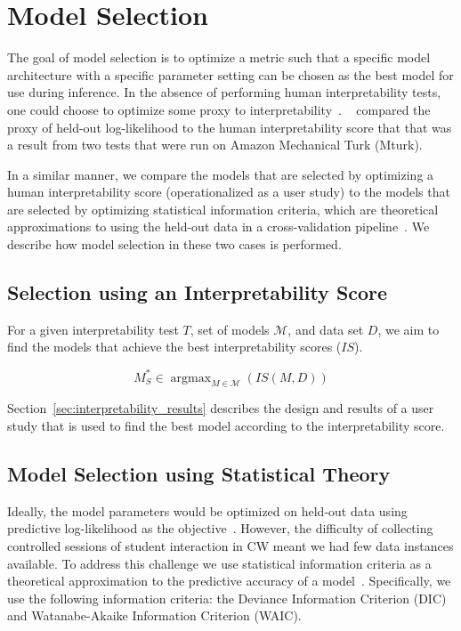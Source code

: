 \documentclass[letterpaper]{article}
\newcommand{\citename}[1]{\citeauthor{#1}~\shortcite{#1}}
\DeclareMathOperator{\argmax}{argmax}
\begin{document}
\section{Model Selection}
\label{sec:model_selection}
The goal of model selection is to optimize a metric such that a specific model architecture with a specific parameter setting can be chosen as the best model for use during inference.
In the absence of performing human interpretability tests, one could choose to optimize some proxy to interpretability~\cite{doshi2017roadmap,lage2018human}. \citename{chang2009reading} compared the proxy of held-out log-likelihood to the human interpretability score that that was a result from two tests that were run on Amazon Mechanical Turk (Mturk).

In a similar manner, we compare the models that are selected by optimizing a human interpretability score  (operationalized as a user  study) to the models that are selected by optimizing statistical information criteria, which are theoretical approximations to using the held-out data in a cross-validation pipeline~\cite{gelman2013bayesian}.
We describe how model selection in these two cases is performed.

\subsection{Selection using an Interpretability Score}

For a given interpretability test $T$,  set of models $\mathcal{M}$, and data set $D$, we aim to find the models that achieve the best interpretability scores ($IS$).

\begin{equation}
\label{eq:model_int_score}
M^*_S \in \argmax_{M \in \mathcal{M}}(IS(M, D))
\end{equation}

Section~\ref{sec:interpretability_results} describes the design and results of a  user study that is
used to find the best model according to the interpretability score.




\subsection{Model Selection using Statistical Theory}
\label{sec:baseline}

Ideally, the model parameters would be optimized on held-out data using predictive log-likelihood as the objective~\cite{chang2009reading}.
However, the difficulty of collecting controlled sessions of student interaction in CW meant we had few data instances available.
To address this challenge we use  statistical information criteria as a theoretical approximation to the predictive accuracy of a model~\cite{gelman2013bayesian}. Specifically, we use the following information criteria:
the {Deviance Information Criterion (DIC)} and {Watanabe-Akaike Information Criterion (WAIC)}.
\end{document}
